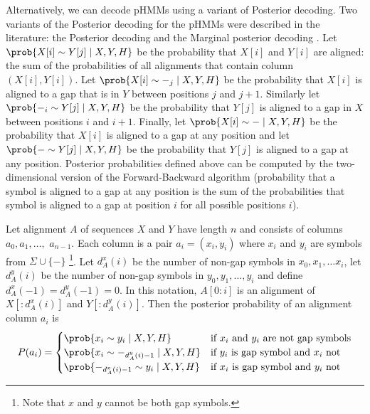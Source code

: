Alternatively, we can decode pHMMs using a variant of Posterior decoding.  Two
variants of the Posterior decoding for the pHMMs were described in the
literature: the Posterior decoding and the Marginal posterior decoding
\cite{Lunter2008}.  Let $\prob{X[i]\sim Y[j]\mid X,Y,H}$ be the probability that
$X[i]$ and $Y[i]$ are aligned: the sum of the probabilities of all alignments
that
contain column $(X[i],Y[i])$. Let $\prob{X[i]\sim -_j\mid X,Y,H}$ be the
probability that $X[i]$ is aligned to a gap that is in $Y$ between positions $j$
and $j+1$. Similarly let $\prob{-_i\sim Y[j]\mid X,Y,H}$ be the probability that $Y[j]$
is aligned to a gap in $X$ between positions $i$ and $i+1$. Finally, let
$\prob{X[i]\sim - \mid X,Y,H}$ be the probability that $X[i]$ is aligned to a
gap at any position and let $\prob{-\sim Y[j]\mid X,Y,H}$ be the probability
that $Y[j]$ is aligned to a gap at any position.  Posterior probabilities
defined above can be computed by the two-dimensional version of the
Forward-Backward algorithm (probability that a symbol is aligned to a gap at any position
is the sum of the probabilities that symbol is aligned to a gap at position $i$
for all possible positions $i$).

Let alignment $A$ of sequences $X$ and $Y$ have length $n$ and
consists of columns $a_0,a_1,\dots,$ $a_{n-1}$. Each column is a pair
$a_i=(x_i,y_i)$ where $x_i$ and $y_i$ are symbols from $\Sigma\cup\{-\}$ \footnote{Note that $x$ and $y$ cannot be both gap symbols.}.
Let $d_A^x(i)$ be the number of non-gap symbols in $x_0,x_1,\dots x_{i}$,
let $d_A^y(i)$ be the number of non-gap symbols in $y_0,y_1,\dots, y_{i}$ and
define $d_A^x(-1)=d_A^y(-1)=0$. In this notation, $A[0:i]$ is an alignment of $X[:d_A^x(i)]$ 
and $Y[:d_A^y(i)]$. Then the posterior probability of an alignment column $a_i$ is
\[P(a_i)=
\begin{cases}
\prob{x_i\sim y_i\mid X,Y,H} & \text{if $x_i$ and $y_i$ are not gap symbols}\\
\prob{x_i\sim -_{d_A^y(i)-1}\mid X,Y,H}  & \text{if $y_i$ is gap symbol and $x_i$ not}\\
\prob{-_{d_A^x(i)-1}\sim y_i\mid X,Y,H}  & \text{if $x_i$ is gap symbol and $y_i$ not}
\end{cases}
\]

